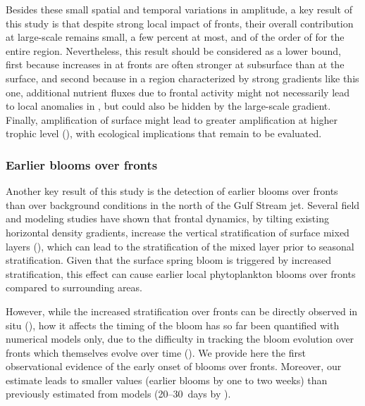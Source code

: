 Besides these small spatial and temporal variations in amplitude, a key result of this study is that despite strong local impact of fronts, their overall contribution at large-scale remains small, a few percent at most, and of the order of  for the entire region.
Nevertheless, this result should be considered as a lower bound, first because increases in  at fronts are often stronger at subsurface than at the surface, and second because in a region characterized by strong gradients like this one, additional nutrient fluxes due to frontal activity might not necessarily lead to local anomalies in , but could also be hidden by the large-scale gradient.
Finally,  amplification of surface  might lead to greater amplification at higher trophic level (\cite{stock_2014, lotze_2019}), with ecological implications that remain to be evaluated.


\subsubsection{Earlier blooms over fronts}

Another key result of this study is the detection of earlier blooms over fronts than over background conditions in the north of the Gulf Stream jet.
Several field and modeling studies have shown that frontal dynamics, by tilting existing horizontal density gradients, increase the vertical stratification of surface mixed layers (\cite{taylor_2011}), which can lead to the stratification of the mixed layer prior to seasonal stratification.
Given that the surface spring bloom is triggered by increased stratification, this effect can cause earlier local phytoplankton blooms over fronts compared to surrounding areas.

However, while the increased stratification over fronts can be directly observed in situ (\cite{karleskind_2011, mahadevan_2012}), how it affects the timing of the bloom has so far been quantified with numerical models only, due to the difficulty in tracking the bloom evolution over fronts which themselves evolve over time (\cite{levy_2000, karleskind_2011, mahadevan_2012}).
We provide here the first observational evidence of the early onset of blooms over fronts.
Moreover, our estimate leads to smaller values (earlier blooms by one to two weeks) than previously estimated from models (20--30~days by \textcite{mahadevan_2012}).

